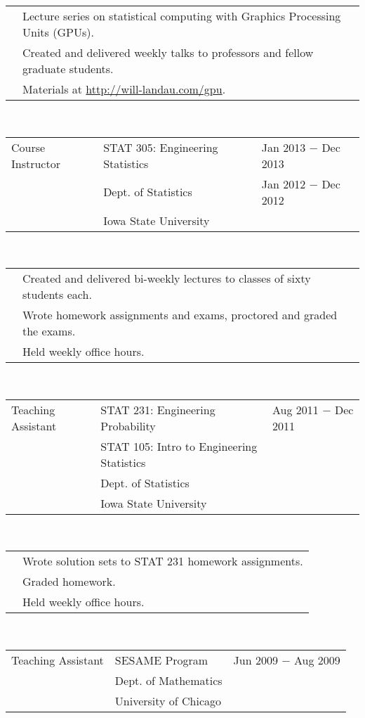 \documentclass{article}
\newcommand{\q}{$\quad$ \newline}
\newcommand{\vl}{4.25}
\newcommand{\wl}{8.4}
\newcommand{\ww}{13}
\begin{document}
 \noindent \begin{tabular}{@{}p{\vl cm}p{\ww cm}@{}}
& Lecture series on statistical computing with Graphics Processing Units (GPUs). \\
& Created and delivered weekly talks to professors and fellow graduate students. \\
& Materials at \href{http://will-landau.com/gpu}{http://will-landau.com/gpu}.
\end{tabular} \q \q  


\noindent \begin{tabular}{@{}p{\vl cm}p{\wl cm}l@{}}
Course Instructor & STAT 305: Engineering Statistics & Jan 2013 $-$ Dec 2013 \\
& Dept. of Statistics & Jan 2012 $-$ Dec 2012 \\
& Iowa State University & 
\end{tabular} \q \q

\noindent \begin{tabular}{@{}p{\vl cm}p{\ww cm}@{}}
& Created and delivered bi-weekly lectures to classes of sixty students each. \\
& Wrote homework assignments and exams, proctored and graded the exams. \\
& Held weekly office hours.
\end{tabular} \q \q  

\noindent \begin{tabular}{@{}p{\vl cm}p{\wl cm}l@{}}
Teaching Assistant & STAT 231: Engineering Probability & Aug 2011 $-$ Dec 2011 \\
& STAT 105: Intro to Engineering Statistics & \\
& Dept. of Statistics & \\
& Iowa State University & \\
\end{tabular} \q \q

\noindent \begin{tabular}{@{}p{\vl cm}p{\ww cm}@{}}
& Wrote solution sets to STAT 231 homework assignments. \\
& Graded homework. \\
& Held weekly office hours.
\end{tabular} \q \q  

\noindent \begin{tabular}{@{}p{\vl cm}p{\wl cm}l@{}}
Teaching Assistant & SESAME Program & Jun 2009 $-$ Aug 2009 \\
& Dept. of Mathematics & \\
& University of Chicago &
\end{tabular} \q \q
\end{document}
